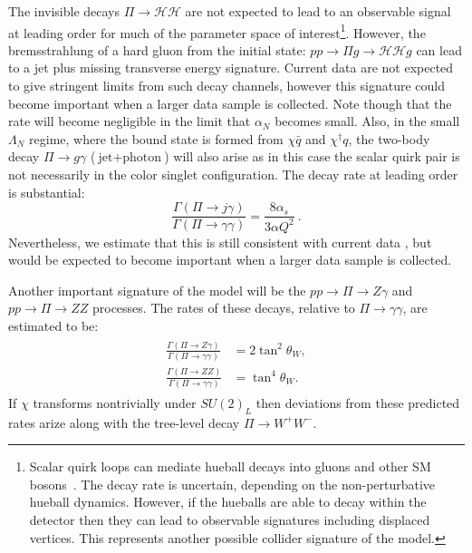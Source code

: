 The invisible decays $\Pi \rightarrow \mathcal{H} \mathcal{H}$ are not expected
to lead to an observable signal at leading order for much of the parameter space
of interest\footnote{Scalar quirk loops can mediate hueball decays into gluons
  and other SM bosons~\cite{Carlson:1991zn, Juknevich:2009ji, Juknevich:2009gg}. The decay
  rate is uncertain, depending on the non-perturbative hueball dynamics.
  However, if the hueballs are able to decay within the detector then they can
  lead to observable signatures including displaced vertices. This represents
  another possible collider signature of the model.}. However, the
bremsstrahlung of a hard gluon from the initial state:
$pp \rightarrow \Pi g \rightarrow \mathcal{H}\mathcal{H} g$ can lead to a jet
plus missing transverse energy signature. Current data are not expected to give
stringent limits from such decay channels, however this signature could become
important when a larger data sample is collected. Note though that the rate will
become negligible in the limit that $\alpha_{N}$ becomes small. Also, in the
small $\Lambda_{N}$ regime, where the bound state is formed from $\chi \bar{q}$
and $\chi^\dagger q$, the two-body decay $\Pi \rightarrow g \gamma$
($\text{jet} + \text{photon}$) will also arise as in this case the scalar quirk
pair is not necessarily in the color singlet configuration. The decay rate at
leading order is substantial:
\begin{equation}
  \frac{\Gamma(\Pi \rightarrow j\gamma)}{\Gamma(\Pi \rightarrow \gamma \gamma)} = \frac{8\alpha_s}{3\alpha Q^2}\ .
\end{equation}
Nevertheless, we estimate that this is still consistent with current data
\cite{Aad:2015ywd}, but would be expected to become important when a larger data
sample is collected.

Another important signature of the model will be the $pp \rightarrow \Pi \rightarrow Z\gamma$
and $pp \rightarrow \Pi \rightarrow ZZ$ processes. The rates of these decays, relative to $\Pi
\rightarrow \gamma \gamma$, are estimated to be:
\begin{align}
  \begin{split}
    \frac{\Gamma (\Pi \rightarrow Z \gamma) }{\Gamma (\Pi \rightarrow \gamma \gamma)} &= 2 \tan^2 \theta_{W},\\
    \frac{\Gamma (\Pi \rightarrow Z Z) }{\Gamma (\Pi \rightarrow \gamma \gamma)} &= \tan^4 \theta_{W}.
  \end{split}
\end{align}
If $\chi$ transforms nontrivially under $SU(2)_{L}$ then deviations from these
predicted rates arize along with the tree-level decay $\Pi \rightarrow W^+ W^-$.

